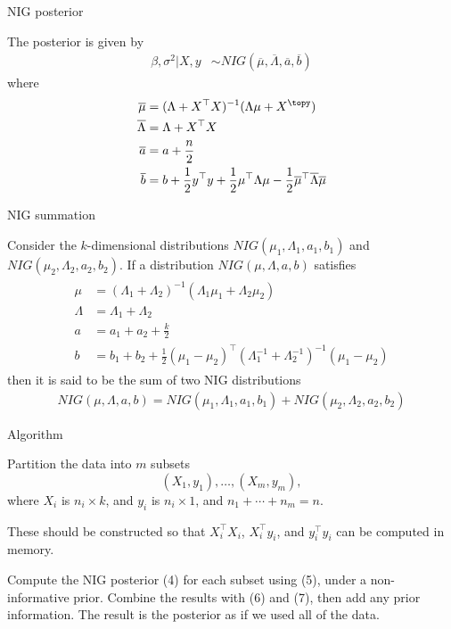 \documentclass[mathserif, 11pt, t]{beamer}
\begin{document}
\begin{frame}{NIG posterior}

The posterior is given by
\begin{align}
\beta,\sigma^2 |X, y &\sim NIG(\overline{\mu}, \overline{\Lambda}, \overline{a}, \overline{b})
\end{align}
where
\begin{align}
\begin{split}
\overline{\mu} &= (\Lambda + X^\top X)^{-1}(\Lambda \mu + X^\topy) \\
\overline{\Lambda} &= \Lambda + X^\top X \\
\overline{a} &= a + \frac{n}{2} \\
\overline{b} &= b + \frac{1}{2}y^\top y + \frac{1}{2}\mu^\top \Lambda\mu -\frac{1}{2}\overline{\mu}^\top\overline{\Lambda}\overline{\mu} 
\end{split}
\end{align}

\end{frame}


\begin{frame}{NIG summation}

Consider the $k$-dimensional distributions $NIG(\mu_1, \Lambda_1, a_1, b_1)$ and $NIG(\mu_2, \Lambda_2, a_2, b_2)$. If a distribution $NIG(\mu, \Lambda, a, b)$ satisfies
\begin{align}
\begin{split}
\mu &=(\Lambda_1+\Lambda_2)^{-1}(\Lambda_1\mu_1 + \Lambda_2\mu_2) \\
\Lambda &=\Lambda_1+\Lambda_2 \\
a &=a_1+a_2+\frac{k}{2} \\
b &=b_1+b_2+\frac{1}{2}(\mu_1-\mu_2)^\top(\Lambda_1^{-1}+\Lambda_2^{-1})^{-1}(\mu_1-\mu_2)
\end{split}
\end{align}
then it is said to be the sum of two NIG distributions
\begin{align}
NIG(\mu, \Lambda, a, b) = NIG(\mu_1, \Lambda_1, a_1, b_1) + NIG(\mu_2, \Lambda_2, a_2, b_2)
\end{align}

\end{frame}


\begin{frame}{Algorithm}

Partition the data into $m$ subsets
\[ (X_1, y_1), \ldots, (X_m, y_m), \]
where $X_i$ is $n_i \times k$, and $y_i$ is $n_i\times 1$, and $n_1+\cdots+n_m=n$.
\bigskip

These should be constructed so that $X_i^\top X_i$, $X_i^\top y_i$, and $y_i^\top y_i$ can be computed in memory.        
\bigskip

Compute the NIG posterior (4) for each subset using (5), under a non-informative prior. Combine the results with (6) and (7), then add any prior information. The result is the posterior as if we used all of the data.

\end{frame}
\end{document}
